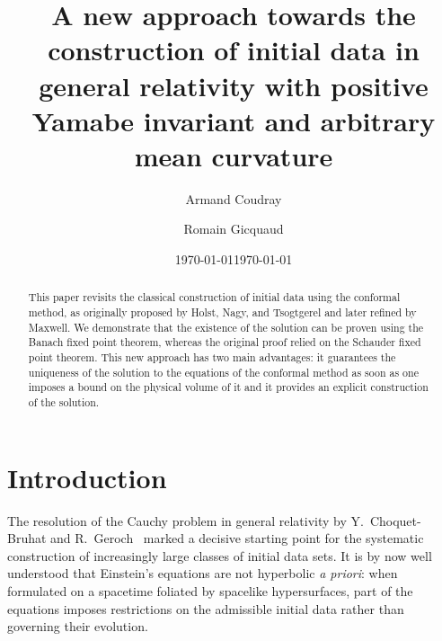 \documentclass[a4paper, 10pt, reqno]{amsart}
\date{\today}
\theoremstyle{plain}
\theoremstyle{remark}
\theoremstyle{definition}
\begin{document}


\author{Armand Coudray \and Romain Gicquaud}
\address[A. Coudray and R. Gicquaud]{Institut Denis Poisson \\ UFR Sciences et Technologie \\
    Facult\'e de Tours \\ Parc de Grandmont\\ 37200 Tours \\ FRANCE}

\title[Uniqueness for the conformal method]{A new approach towards the construction of initial data in general relativity with positive Yamabe invariant and arbitrary mean curvature}

\begin{abstract}
    This paper revisits the classical construction of initial data using the
    conformal method, as originally proposed by Holst, Nagy, and Tsogtgerel and
    later refined by Maxwell. We demonstrate that the existence of the solution can
    be proven using the Banach fixed point theorem, whereas the original proof
    relied on the Schauder fixed point theorem. This new approach has two main
    advantages: it guarantees the uniqueness of the solution to the equations of
    the conformal method as soon as one imposes a bound on the physical volume of
    it and it provides an explicit construction of the solution.
\end{abstract}

\date{\today}
\maketitle

\tableofcontents

\section{Introduction}\label{secIntro}
The resolution of the Cauchy problem in general relativity by Y.~Choquet-Bruhat
and R.~Geroch~\cite{CB1, CB2} marked a decisive starting point for the
systematic construction of increasingly large classes of initial data sets. It
is by now well understood that Einstein’s equations are not hyperbolic \emph{a
    priori}: when formulated on a spacetime foliated by spacelike hypersurfaces,
part of the equations imposes restrictions on the admissible initial data
rather than governing their evolution.
\end{document}
